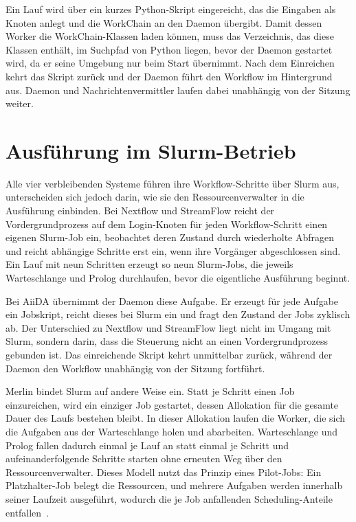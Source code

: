 Ein Lauf wird über ein kurzes Python-Skript eingereicht, das die
Eingaben als Knoten anlegt und die WorkChain an den Daemon
übergibt. Damit dessen Worker die WorkChain-Klassen laden können, muss das Verzeichnis, das diese Klassen enthält, im Suchpfad von Python liegen, bevor der Daemon gestartet wird, da er seine Umgebung nur beim Start übernimmt. Nach dem Einreichen kehrt das Skript zurück und der
Daemon führt den Workflow im Hintergrund aus. Daemon und
Nachrichtenvermittler laufen dabei unabhängig von der Sitzung
weiter.


\section{Ausführung im Slurm-Betrieb}
\label{sec:mogon:slurmbetrieb}

Alle vier verbleibenden Systeme führen ihre Workflow-Schritte über
Slurm aus, unterscheiden sich jedoch darin, wie sie den
Ressourcenverwalter in die Ausführung einbinden. Bei Nextflow und
StreamFlow reicht der Vordergrundprozess auf dem Login-Knoten für
jeden Workflow-Schritt einen eigenen Slurm-Job ein, beobachtet deren Zustand durch wiederholte Abfragen und reicht abhängige
Schritte erst ein, wenn ihre Vorgänger abgeschlossen sind. Ein Lauf
mit neun Schritten erzeugt so neun Slurm-Jobs, die
jeweils Warteschlange und Prolog durchlaufen, bevor die eigentliche
Ausführung beginnt.

Bei AiiDA übernimmt der Daemon diese Aufgabe. Er erzeugt für jede
Aufgabe ein Jobskript, reicht dieses bei Slurm ein und fragt den
Zustand der Jobs zyklisch ab. Der Unterschied zu Nextflow und
StreamFlow liegt nicht im Umgang mit Slurm, sondern darin, dass die
Steuerung nicht an einen Vordergrundprozess gebunden ist. Das
einreichende Skript kehrt unmittelbar zurück, während der Daemon
den Workflow unabhängig von der Sitzung fortführt.

Merlin bindet Slurm auf andere Weise ein. Statt je Schritt einen
Job einzureichen, wird ein einziger Job gestartet, dessen
Allokation für die gesamte Dauer des Laufs bestehen bleibt. In dieser Allokation laufen die Worker, die sich die Aufgaben aus der Warteschlange
holen und abarbeiten. Warteschlange und Prolog fallen dadurch
einmal je Lauf an statt einmal je Schritt und aufeinanderfolgende Schritte starten ohne erneuten Weg über den
Ressourcenverwalter. Dieses Modell nutzt das Prinzip eines Pilot-Jobs: Ein Platzhalter-Job belegt die Ressourcen, und mehrere Aufgaben werden innerhalb seiner Laufzeit ausgeführt, wodurch die je Job anfallenden Scheduling-Anteile entfallen~\cite[S.~18]{chen2011overhead}.

